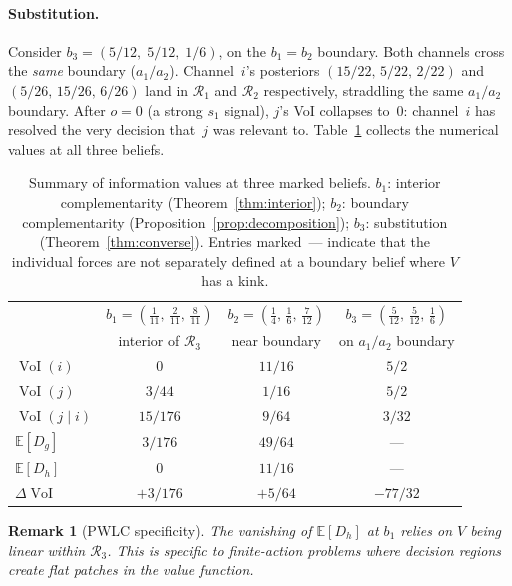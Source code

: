 \documentclass{article}
\newcommand{\VoI}{\operatorname{VoI}}
\newcommand{\E}{\mathbb{E}}
\newcommand{\Dg}{D_g}
\newcommand{\Dh}{D_h}
\newtheorem{remark}[theorem]{Remark}
\begin{document}
\paragraph{Substitution.}
Consider $b_3 = (5/12,\; 5/12,\; 1/6)$, on the $b_1 = b_2$ boundary. Both channels cross the \emph{same} boundary ($a_1/a_2$). Channel~$i$'s posteriors $(15/22,\, 5/22,\, 2/22)$ and $(5/26,\, 15/26,\, 6/26)$ land in $\mathcal{R}_1$ and $\mathcal{R}_2$ respectively, straddling the same $a_1/a_2$ boundary. After $o{=}0$ (a strong $s_1$ signal), $j$'s VoI collapses to~$0$: channel~$i$ has resolved the very decision that~$j$ was relevant to. Table~\ref{tab:results} collects the numerical values at all three beliefs.

\begin{table}[b]
\centering
\small
\begin{tabular}{@{}lccc@{}}
\toprule
 & $b_1 = (\tfrac{1}{11},\, \tfrac{2}{11},\, \tfrac{8}{11})$
 & $b_2 = (\tfrac{1}{4},\, \tfrac{1}{6},\, \tfrac{7}{12})$
 & $b_3 = (\tfrac{5}{12},\, \tfrac{5}{12},\, \tfrac{1}{6})$ \\
 & {\scriptsize interior of $\mathcal{R}_3$}
 & {\scriptsize near boundary}
 & {\scriptsize on $a_1/a_2$ boundary} \\
\midrule
$\VoI(i)$            & $0$       & $11/16$  & $5/2$    \\
$\VoI(j)$            & $3/44$    & $1/16$   & $5/2$    \\
$\VoI(j \mid i)$     & $15/176$  & $9/64$   & $3/32$   \\
\addlinespace
$\E[\Dg]$            & $3/176$   & $49/64$  & ---      \\
$\E[\Dh]$            & $0$       & $11/16$  & ---      \\
\addlinespace
$\Delta\VoI$         & $+3/176$  & $+5/64$  & $-77/32$ \\
\bottomrule
\end{tabular}
\vspace{1em}
\caption{Summary of information values at three marked beliefs. $b_1$: interior complementarity (Theorem~\ref{thm:interior}); $b_2$: boundary complementarity (Proposition~\ref{prop:decomposition}); $b_3$: substitution (Theorem~\ref{thm:converse}). Entries marked~--- indicate that the individual forces are not separately defined at a boundary belief where $V$ has a kink.}
\label{tab:results}
\end{table}

\begin{remark}[PWLC specificity]
\label{rem:pwlc}
The vanishing of $\E[\Dh]$ at $b_1$ relies on $V$ being linear within $\mathcal{R}_3$. This is specific to finite-action problems where decision regions create flat patches in the value function.
\end{remark}
\end{document}

